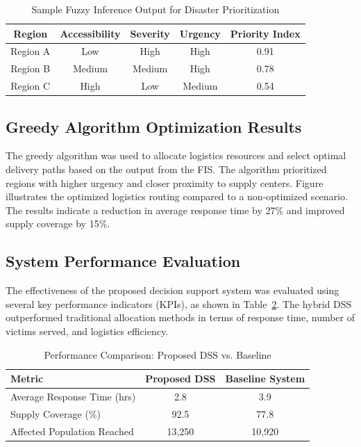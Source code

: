 \documentclass[journal,final,a4paper,twoside,11pt]{IEEEtran}
\begin{document}
\begin{table}[htbp]
\caption{Sample Fuzzy Inference Output for Disaster Prioritization}
\begin{center}
\begin{tabular}{|c|c|c|c|c|}
\hline
\textbf{Region} & \textbf{Accessibility} & \textbf{Severity} & \textbf{Urgency} & \textbf{Priority Index} \\
\hline
Region A & Low & High & High & 0.91 \\
Region B & Medium & Medium & High & 0.78 \\
Region C & High & Low & Medium & 0.54 \\
\hline
\end{tabular}
\label{tab:fuzzyoutput}
\end{center}
\end{table}

\subsection{Greedy Algorithm Optimization Results}
The greedy algorithm was used to allocate logistics resources and select optimal delivery paths based on the output from the FIS. The algorithm prioritized regions with higher urgency and closer proximity to supply centers. Figure~ illustrates the optimized logistics routing compared to a non-optimized scenario. The results indicate a reduction in average response time by 27\% and improved supply coverage by 15\%.



\subsection{System Performance Evaluation}
The effectiveness of the proposed decision support system was evaluated using several key performance indicators (KPIs), as shown in Table~\ref{tab:performance}. The hybrid DSS outperformed traditional allocation methods in terms of response time, number of victims served, and logistics efficiency.

\begin{table}[htbp]
\caption{Performance Comparison: Proposed DSS vs. Baseline}
\begin{center}
\begin{tabular}{|l|c|c|}
\hline
\textbf{Metric} & \textbf{Proposed DSS} & \textbf{Baseline System} \\
\hline
Average Response Time (hrs) & 2.8 & 3.9 \\
Supply Coverage (\%) & 92.5 & 77.8 \\
Affected Population Reached & 13,250 & 10,920 \\
\hline
\end{tabular}
\label{tab:performance}
\end{center}
\end{table}
\end{document}
